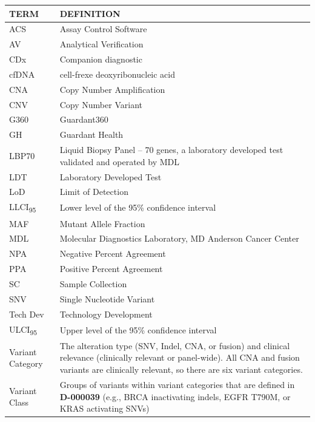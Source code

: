 \documentclass[12pt]{protocol}
\begin{document}
\renewcommand{\arraystretch}{1.1}
\begin{tabular}{|L{1.5in}|L{5.5in}|} \hline
	 \textbf{TERM} & \textbf{DEFINITION} \\ \hline
	ACS & Assay Control Software \\ \hline
	AV & Analytical Verification \\ \hline
	CDx & Companion diagnostic \\ \hline
	cfDNA & cell-frexe deoxyribonucleic acid \\ \hline
	CNA & Copy Number Amplification \\ \hline
	CNV & Copy Number Variant \\ \hline
	G360 & Guardant360 \\ \hline
	GH & Guardant Health \\ \hline
	LBP70 & Liquid Biopsy Panel – 70 genes, a laboratory developed 
	        test validated and operated by MDL \\ \hline
	LDT & Laboratory Developed Test \\ \hline
	LoD & Limit of Detection \\ \hline
	LLCI\textsubscript{95} & Lower level of the 95\% confidence interval \\ \hline
	MAF & Mutant Allele Fraction \\ \hline
	MDL & Molecular Diagnostics Laboratory, MD Anderson Cancer Center \\ \hline
	NPA & Negative Percent Agreement \\ \hline
	PPA & Positive Percent Agreement \\ \hline
	SC & Sample Collection \\ \hline
	SNV & Single Nucleotide Variant \\ \hline
	Tech Dev & Technology Development \\ \hline
	ULCI\textsubscript{95} & Upper level of the 95\% confidence interval \\ \hline
	Variant Category & The alteration type (SNV, Indel, CNA, or fusion) and 
	clinical relevance (clinically relevant or panel-wide). All CNA and fusion variants
	are clinically relevant, so there are six variant categories. \\ \hline
	Variant Class & Groups of variants within variant categories that are 
	defined in \textbf{D-000039} (e.g., BRCA inactivating indels, EGFR T790M,
	or KRAS activating SNVs) \\ \hline
\end{tabular}
\end{document}

